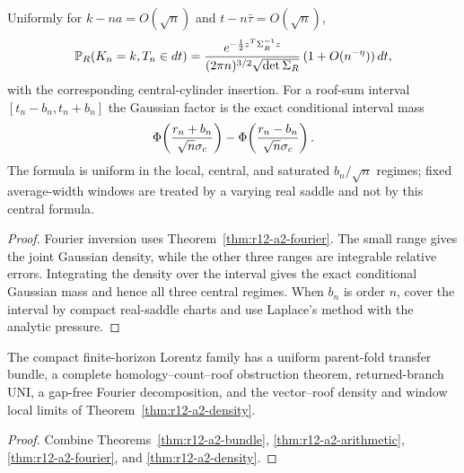 \begin{theorem}
\label{thm:r12-a2-density}
Uniformly for $k-na=O(\sqrt n)$ and $t-n\bar\tau=O(\sqrt n)$,
\[
 \mathbb P_R(K_n=k,T_n\in dt)
 ={e^{-\frac12 z^T\Sigma_R^{-1}z}\over
   (2\pi n)^{3/2}\sqrt{\det\Sigma_R}}\,(1+O(n^{-\eta}))\,dt,
\]
with the corresponding central-cylinder insertion.  For a roof-sum interval
$[t_n-b_n,t_n+b_n]$ the Gaussian factor is the exact conditional interval
mass
\[
 \Phi\!\left({r_n+b_n\over\sqrt n\sigma_c}\right)
 -\Phi\!\left({r_n-b_n\over\sqrt n\sigma_c}\right).
\]
The formula is uniform in the local, central, and saturated
$b_n/\sqrt n$ regimes; fixed average-width windows are treated by a varying
real saddle and not by this central formula.
\end{theorem}

\begin{proof}
Fourier inversion uses Theorem~\ref{thm:r12-a2-fourier}.  The small range gives
the joint Gaussian density, while the other three ranges are integrable
relative errors.  Integrating the density over the interval gives the exact
conditional Gaussian mass and hence all three central regimes.  When
$b_n$ is order $n$, cover the interval by compact real-saddle charts and use
Laplace's method with the analytic pressure.
\end{proof}

\begin{theorem}
\label{thm:r12-a2-main}
The compact finite-horizon Lorentz family has a uniform parent-fold transfer
bundle, a complete homology--count--roof obstruction theorem, returned-branch
UNI, a gap-free Fourier decomposition, and the vector--roof density and window
local limits of Theorem~\ref{thm:r12-a2-density}.
\end{theorem}

\begin{proof}
Combine Theorems~\ref{thm:r12-a2-bundle},
\ref{thm:r12-a2-arithmetic}, \ref{thm:r12-a2-fourier}, and
\ref{thm:r12-a2-density}.
\end{proof}
